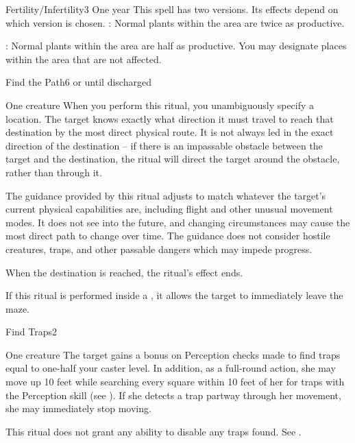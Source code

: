 \begin{spellsection}{Fertility/Infertility}{3}
\spelldur One year
\spellspecial This spell has two versions. Its effects depend on which version is chosen.
: Normal plants within the area are twice as productive.
\par {}: Normal plants within the area are half as productive.
\spellnotes You may designate places within the area that are not affected.
\end{spellsection}

\begin{spellsection}{Find the Path}{6}
\spelldur \durext or until discharged \dismissable
\begin{spelltarget}{One creature}
    \spelleffect When you perform this ritual, you unambiguously specify a location. The target knows exactly what direction it must travel to reach that destination by the most direct physical route. It is not always led in the exact direction of the destination -- if there is an impassable obstacle between the target and the destination, the ritual will direct the target around the obstacle, rather than through it.

    The guidance provided by this ritual adjusts to match whatever the target's current physical capabilities are, including flight and other unusual movement modes. It does not see into the future, and changing circumstances may cause the most direct path to change over time. The guidance does not consider hostile creatures, traps, and other passable dangers which may impede progress.

    When the destination is reached, the ritual's effect ends.
\end{spelltarget}

\spellnotes If this ritual is performed inside a , it allows the target to immediately leave the maze.

\end{spellsection}

\begin{spellsection}{Find Traps}{2}
\spelldur \durmed
\begin{spelltarget}{One creature}
    \spelleffect The target gains a bonus on Perception checks made to find traps equal to one-half your caster level. In addition, as a full-round action, she may move up 10 feet while searching every square within 10 feet of her for traps with the Perception skill (see ). If she detects a trap partway through her movement, she may immediately stop moving.
\end{spelltarget}
\spellnotes This ritual does not grant any ability to disable any traps found. See .
\end{spellsection}

